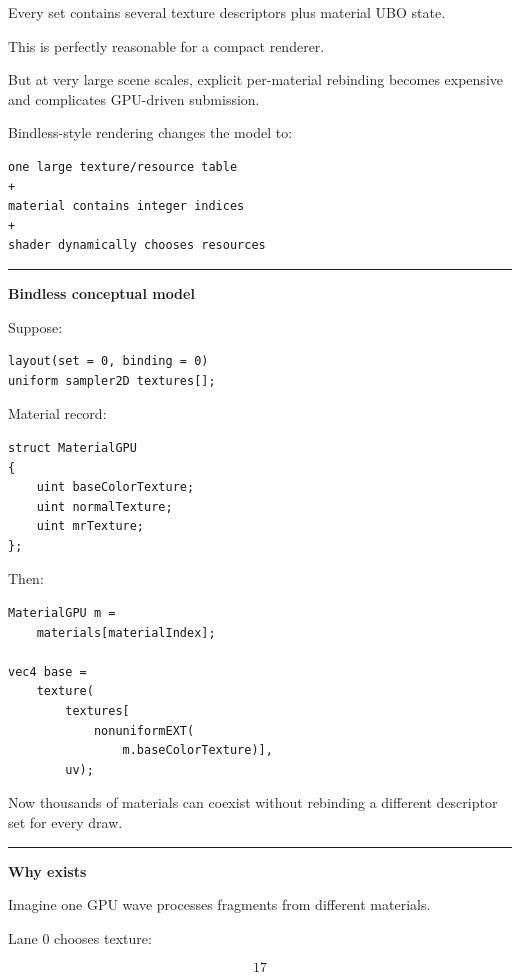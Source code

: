 Every set contains several texture descriptors plus material UBO state.

This is perfectly reasonable for a compact renderer.

But at very large scene scales, explicit per-material rebinding becomes expensive and complicates GPU-driven submission.

Bindless-style rendering changes the model to:

\begin{verbatim}
one large texture/resource table
+
material contains integer indices
+
shader dynamically chooses resources
\end{verbatim}

\begin{center}\rule{0.5\linewidth}{0.5pt}\end{center}

\textbf{Bindless conceptual model}

Suppose:

\begin{verbatim}
layout(set = 0, binding = 0)
uniform sampler2D textures[];
\end{verbatim}

Material record:

\begin{verbatim}
struct MaterialGPU
{
    uint baseColorTexture;
    uint normalTexture;
    uint mrTexture;
};
\end{verbatim}

Then:

\begin{verbatim}
MaterialGPU m =
    materials[materialIndex];

vec4 base =
    texture(
        textures[
            nonuniformEXT(
                m.baseColorTexture)],
        uv);
\end{verbatim}

Now thousands of materials can coexist without rebinding a different descriptor set for every draw.

\begin{center}\rule{0.5\linewidth}{0.5pt}\end{center}

\textbf{Why  exists}

Imagine one GPU wave processes fragments from different materials.

Lane 0 chooses texture:

\[
17
\]

